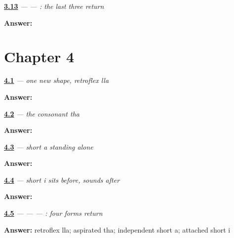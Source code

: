 \noindent\begin{minipage}[t]{\linewidth}
\raggedright
\hyperlink{review-GU-R03-doorway-three-r1-dictation}{\textbf{3.13}} \emph{ —  — : the last three return}\par
\small \textbf{Answer:}   \par
\end{minipage}\par\medskip

\section*{Chapter 4}

\noindent\begin{minipage}[t]{\linewidth}
\raggedright
\hyperlink{review-GU-W04-lla-recall}{\textbf{4.1}} \emph{ — one new shape, retroflex lla}\par
\small \textbf{Answer:} \par
\end{minipage}\par\medskip

\noindent\begin{minipage}[t]{\linewidth}
\raggedright
\hyperlink{review-GU-W04-tha-recall}{\textbf{4.2}} \emph{ — the consonant tha}\par
\small \textbf{Answer:} \par
\end{minipage}\par\medskip

\noindent\begin{minipage}[t]{\linewidth}
\raggedright
\hyperlink{review-GU-W04-independent-a-recall}{\textbf{4.3}} \emph{ — short a standing alone}\par
\small \textbf{Answer:} \par
\end{minipage}\par\medskip

\noindent\begin{minipage}[t]{\linewidth}
\raggedright
\hyperlink{review-GU-W04-i-matra-recall}{\textbf{4.4}} \emph{ — short i sits before, sounds after}\par
\small \textbf{Answer:} \par
\end{minipage}\par\medskip

\noindent\begin{minipage}[t]{\linewidth}
\raggedright
\hyperlink{review-GU-R04-first-four-r1-reading}{\textbf{4.5}} \emph{ —  —  — : four forms return}\par
\small \textbf{Answer:} retroflex lla; aspirated tha; independent short a; attached short i\par
\end{minipage}\par\medskip

